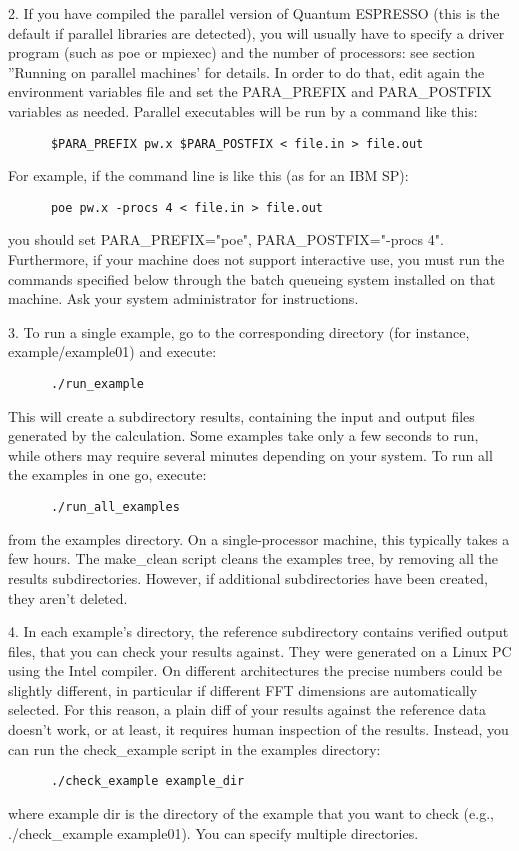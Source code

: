 \documentclass[12pt,a4paper]{article}
\begin{document}
2. If you have compiled the parallel version of Quantum ESPRESSO (this
is the default if parallel libraries are detected), you will usually
have to specify a driver program (such as poe or mpiexec) and the
number of processors: see section ''Running on parallel machines' for
details. In order to do that, edit again the environment variables file
and set the PARA\_PREFIX and PARA\_POSTFIX variables as needed. Parallel
executables will be run by a command like this: 
\begin{verbatim}
      $PARA_PREFIX pw.x $PARA_POSTFIX < file.in > file.out
\end{verbatim}
For example, if the command line is like this (as for an IBM SP):
\begin{verbatim}
      poe pw.x -procs 4 < file.in > file.out
\end{verbatim}
you should set PARA\_PREFIX="poe", PARA\_POSTFIX="-procs
4". Furthermore, if your machine does not support interactive use, you
must run the commands specified below through the batch queueing
system installed on that machine. Ask your system administrator for
instructions. 

3. To run a single example, go to the corresponding directory (for
   instance, example/example01) and execute: 
\begin{verbatim}
      ./run_example
\end{verbatim}
This will create a subdirectory results, containing the input and
output files generated by the calculation. Some examples take only a
few seconds to run, while others may require several minutes depending
on your system. To run all the examples in one go, execute:
\begin{verbatim}
      ./run_all_examples
\end{verbatim}
from the examples directory. On a single-processor machine, this
typically takes a few hours. The make\_clean script cleans the
examples tree, by removing all the results subdirectories. However, if
additional subdirectories have been created, they aren't deleted. 

4. In each example's directory, the reference subdirectory contains
verified output files, that you can check your results against. They
were generated on a Linux PC using the Intel compiler. On different
architectures the precise numbers could be slightly different, in
particular if different FFT dimensions are automatically selected. For
this reason, a plain diff of your results against the reference data
doesn't work, or at least, it requires human inspection of the
results. Instead, you can run the  
check\_example script in the examples directory:
\begin{verbatim}
      ./check_example example_dir
\end{verbatim}
where example dir is the directory of the example that you want to
check (e.g., ./check\_example example01). You can specify multiple
directories.  
\end{document}
